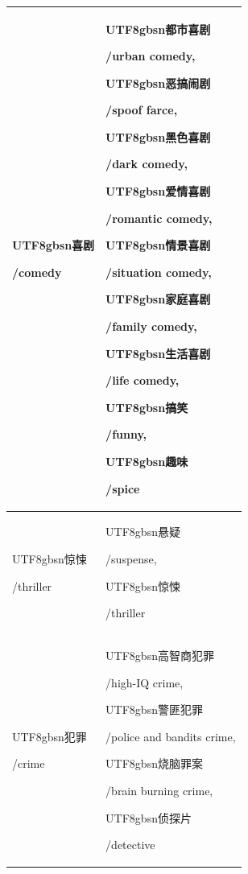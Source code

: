 \begin{table}[h]
\begin{tabularx}{\linewidth}{l|X}
    \begin{CJK*}{UTF8}{gbsn}喜剧\end{CJK*}/comedy & \begin{CJK*}{UTF8}{gbsn}都市喜剧\end{CJK*}/urban comedy, \begin{CJK*}{UTF8}{gbsn}恶搞闹剧\end{CJK*}/spoof farce, \begin{CJK*}{UTF8}{gbsn}黑色喜剧\end{CJK*}/dark comedy, \begin{CJK*}{UTF8}{gbsn}爱情喜剧\end{CJK*}/romantic comedy, \begin{CJK*}{UTF8}{gbsn}情景喜剧\end{CJK*}/situation comedy, \begin{CJK*}{UTF8}{gbsn}家庭喜剧\end{CJK*}/family comedy, \begin{CJK*}{UTF8}{gbsn}生活喜剧\end{CJK*}/life comedy, \begin{CJK*}{UTF8}{gbsn}搞笑\end{CJK*}/funny, \begin{CJK*}{UTF8}{gbsn}趣味\end{CJK*}/spice \\
    \midrule
    \begin{CJK*}{UTF8}{gbsn}惊悚\end{CJK*}/thriller & \begin{CJK*}{UTF8}{gbsn}悬疑\end{CJK*}/suspense, \begin{CJK*}{UTF8}{gbsn}惊悚\end{CJK*}/thriller \\
    \midrule
    \begin{CJK*}{UTF8}{gbsn}犯罪\end{CJK*}/crime & \begin{CJK*}{UTF8}{gbsn}高智商犯罪\end{CJK*}/high-IQ crime, \begin{CJK*}{UTF8}{gbsn}警匪犯罪\end{CJK*}/police and bandits crime, \begin{CJK*}{UTF8}{gbsn}烧脑罪案\end{CJK*}/brain burning crime, \begin{CJK*}{UTF8}{gbsn}侦探片\end{CJK*}/detective \\
    \midrule

\end{tabularx}
\end{table}
